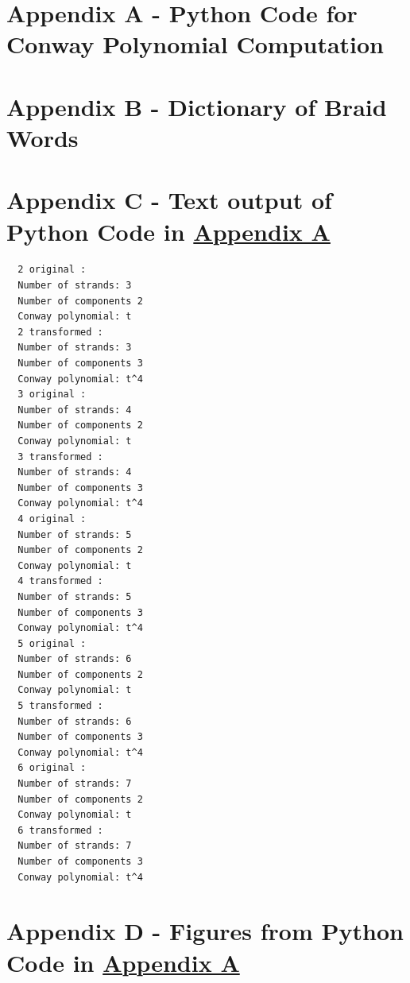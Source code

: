 \documentclass[12pt]{article}
\begin{document}
\section*{Appendix A - Python Code for Conway Polynomial Computation}
\label{appenA}


\pagebreak
\section*{Appendix B - Dictionary of Braid Words}


\pagebreak
\section*{Appendix C - Text output of Python Code in \hyperref[appenA]{Appendix A}}
\begin{lstlisting}
  2 original :
  Number of strands: 3
  Number of components 2
  Conway polynomial: t
  2 transformed :
  Number of strands: 3
  Number of components 3
  Conway polynomial: t^4
  3 original :
  Number of strands: 4
  Number of components 2
  Conway polynomial: t
  3 transformed :
  Number of strands: 4
  Number of components 3
  Conway polynomial: t^4
  4 original :
  Number of strands: 5
  Number of components 2
  Conway polynomial: t
  4 transformed :
  Number of strands: 5
  Number of components 3
  Conway polynomial: t^4
  5 original :
  Number of strands: 6
  Number of components 2
  Conway polynomial: t
  5 transformed :
  Number of strands: 6
  Number of components 3
  Conway polynomial: t^4
  6 original :
  Number of strands: 7
  Number of components 2
  Conway polynomial: t
  6 transformed :
  Number of strands: 7
  Number of components 3
  Conway polynomial: t^4
\end{lstlisting}

\pagebreak
\section*{Appendix D - Figures from Python Code in \hyperref[appenA]{Appendix A}}
\end{document}
